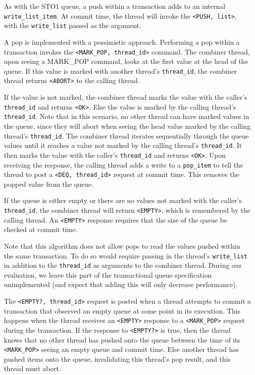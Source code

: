 As with the STO1 queue, a push within a transaction adds to an internal \texttt{write\_list\_item}. At commit time, the thread will invoke the \texttt{<PUSH, list>}, with the \texttt{write\_list} passed as the argument.

A pop is implemented with a pessimistic approach. Performing a pop within a transaction invokes the \texttt{<MARK\_POP, thread\_id>} command. The combiner thread, upon seeing a MARK\_POP command, looks at the first value at the head of the queue. If this value is marked with another thread's \texttt{thread\_id}, the combiner thread returns \texttt{<ABORT>} to the calling thread.

If the value is not marked, the combiner thread marks the value with the caller's \texttt{thread\_id} and returns \texttt{<OK>}. Else the value is marked by the calling thread's \texttt{thread\_id}. Note that in this scenario, no other thread can have marked values in the queue, since they will abort when seeing the head value marked by the calling thread's \texttt{thread\_id}. The combiner thread iterates sequentially through the queue values until it reaches a value not marked by the calling thread's \texttt{thread\_id}. It then marks the value with the caller's \texttt{thread\_id} and returns \texttt{<OK>}. Upon receiving the response, the calling thread adds a write to a \texttt{pop\_item} to tell the thread to post a \texttt{<DEQ, thread\_id>} request at commit time. This removes the popped value from the queue.

If the queue is either empty or there are no values not marked with the caller's \texttt{thread\_id}, the combiner thread will return \texttt{<EMPTY>}, which is remembered by the calling thread. An \texttt{<EMPTY>} response requires that the size of the queue be checked at commit time.

Note that this algorithm does not allow pops to read the values pushed within the same transaction. To do so would require passing in the thread's \texttt{write\_list} in addition to the \texttt{thread\_id} as arguments to the combiner thread. During our evaluation, we leave this part of the transactional queue specification unimplemented (and expect that adding this will only decrease performance).

The \texttt{<EMPTY?, thread\_id>} request is posted when a thread attempts to commit a transaction that observed an empty queue at some point in its execution. This happens when the thread receives an \texttt{<EMPTY>} response to a \texttt{<MARK\_POP>} request during the transaction. If the response to \texttt{<EMPTY?>} is true, then the thread knows that no other thread has pushed onto the queue between the time of its \texttt{<MARK\_POP>} seeing an empty queue and commit time. Else another thread has pushed items onto the queue, invalidating this thread's pop result, and this thread must abort.

